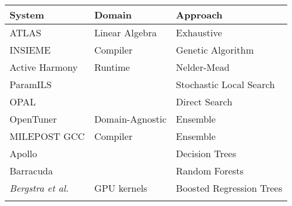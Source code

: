 \begin{table}
    \centering
    \scriptsize
    \begin{tabular}{@{\kern\tabcolsep}lll@{\kern\tabcolsep}}
        \toprule
        System & Domain & Approach \\ \midrule
        \rowcolor{red!25} ATLAS & Linear Algebra & Exhaustive\\ \addlinespace[2pt]
        \rowcolor{green!25} INSIEME & Compiler & Genetic Algorithm \\
        \rowcolor{green!25} Active Harmony & Runtime & Nelder-Mead \\ \addlinespace[2pt]
        \rowcolor{green!25} ParamILS & & Stochastic Local Search \\
        \rowcolor{green!25} OPAL & & Direct Search \\
        \rowcolor{green!25} OpenTuner & \multirow{-3}{*}{Domain-Agnostic} & Ensemble \\ \addlinespace[2pt]
        \rowcolor{cyan!25} MILEPOST GCC & Compiler & Ensemble \\ \addlinespace[2pt]
        \rowcolor{cyan!25} Apollo & & Decision Trees \\
        \rowcolor{cyan!25} Barracuda & & Random Forests \\
        \rowcolor{cyan!25} \textit{Bergstra et al.} & \multirow{-3}{*}{GPU kernels} & Boosted Regression Trees \\ \addlinespace[2pt]
        \bottomrule
    \end{tabular}
\end{table}

